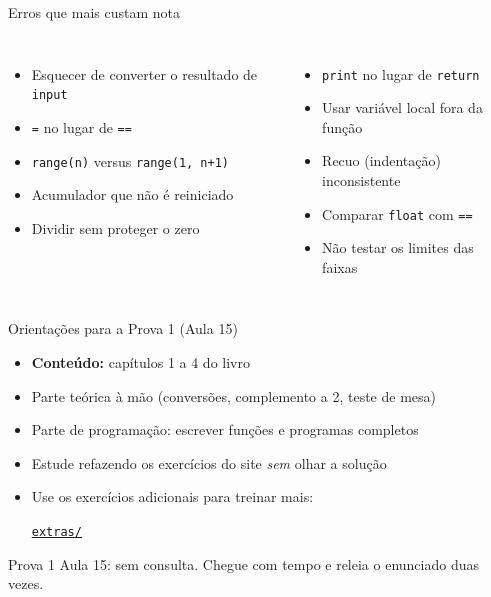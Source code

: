 \documentclass[aspectratio=169,10pt,t]{beamer}
\begin{document}
\begin{frame}{Erros que mais custam nota}
  \begin{columns}[T]
    \begin{itemize}
      \item Esquecer de converter o resultado de \texttt{input}
      \item \texttt{=} no lugar de \texttt{==}
      \item \texttt{range(n)} versus \texttt{range(1, n+1)}
      \item Acumulador que não é reiniciado
      \item Dividir sem proteger o zero
    \end{itemize}
    \begin{itemize}
      \item \texttt{print} no lugar de \texttt{return}
      \item Usar variável local fora da função
      \item Recuo (indentação) inconsistente
      \item Comparar \texttt{float} com \texttt{==}
      \item Não testar os limites das faixas
    \end{itemize}
  \end{columns}
\end{frame}

\begin{frame}{Orientações para a Prova 1 (Aula 15)}
  \begin{itemize}
    \item \textbf{Conteúdo:} capítulos 1 a 4 do livro
    \item Parte teórica à mão (conversões, complemento a 2, teste de mesa)
    \item Parte de programação: escrever funções e programas completos
    \item Estude refazendo os exercícios do site \emph{sem} olhar a solução
    \item Use os exercícios adicionais para treinar mais:
          \par\href{\siteurl extras/}{\texttt{\siteurl extras/}}
  \end{itemize}
  \begin{alertblock}{Prova 1}
    Aula 15: sem consulta. Chegue com tempo e releia o enunciado duas vezes.
  \end{alertblock}
\end{frame}
\end{document}
